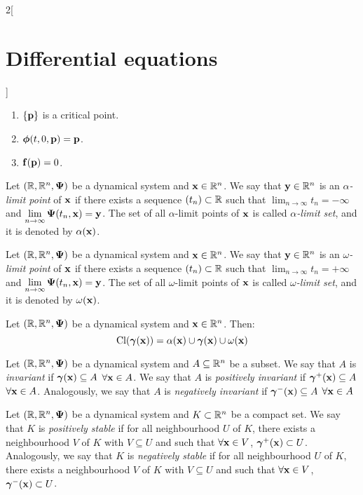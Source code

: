 \documentclass[../../../main.tex]{subfiles}
\begin{document}
\begin{multicols}{2}[\section{Differential equations}]
\begin{prop}
\begin{enumerate}
      \item $\{\boldsymbol{\mathrm{p}}\}$ is a critical point.
      \item $\boldsymbol{\mathrm{\phi}}(t,0,\boldsymbol{\mathrm{p}})=\boldsymbol{\mathrm{p}}$.
      \item $\boldsymbol{\mathrm{f}}(\boldsymbol{\mathrm{p}})=0$.
    \end{enumerate}
  \end{prop}
  \begin{definition}
    Let $(\mathbb{R},\mathbb{R}^n,\boldsymbol{\mathrm{\Psi}})$ be a dynamical system and $\boldsymbol{\mathrm{x}}\in\mathbb{R}^n$. We say that $\boldsymbol{\mathrm{y}}\in\mathbb{R}^n$ is an \emph{$\alpha$-limit point} of $\boldsymbol{\mathrm{x}}$ if there exists a sequence $(t_n)\subset\mathbb{R}$ such that $\displaystyle\lim_{n\to\infty}t_n=-\infty$ and $\displaystyle\lim_{n\to\infty}\boldsymbol{\mathrm{\Psi}}(t_n,\boldsymbol{\mathrm{x}})=\boldsymbol{\mathrm{y}}$.
    The set of all $\alpha$-limit points of $\boldsymbol{\mathrm{x}}$ is called \emph{$\alpha$-limit set}, and it is denoted by $\alpha(\boldsymbol{\mathrm{x}})$.
  \end{definition}
  \begin{definition}
    Let $(\mathbb{R},\mathbb{R}^n,\boldsymbol{\mathrm{\Psi}})$ be a dynamical system and $\boldsymbol{\mathrm{x}}\in\mathbb{R}^n$. We say that $\boldsymbol{\mathrm{y}}\in\mathbb{R}^n$ is an \emph{$\omega$-limit point} of $\boldsymbol{\mathrm{x}}$ if there exists a sequence $(t_n)\subset\mathbb{R}$ such that $\displaystyle\lim_{n\to\infty}t_n=+\infty$ and $\displaystyle\lim_{n\to\infty}\boldsymbol{\mathrm{\Psi}}(t_n,\boldsymbol{\mathrm{x}})=\boldsymbol{\mathrm{y}}$.
    The set of all $\omega$-limit points of $\boldsymbol{\mathrm{x}}$ is called \emph{$\omega$-limit set}, and it is denoted by $\omega(\boldsymbol{\mathrm{x}})$.
  \end{definition}
  \begin{prop}
    Let $(\mathbb{R},\mathbb{R}^n,\boldsymbol{\mathrm{\Psi}})$ be a dynamical system and $\boldsymbol{\mathrm{x}}\in\mathbb{R}^n$. Then: $$\operatorname{Cl}(\boldsymbol{\mathrm{\gamma}}(\boldsymbol{\mathrm{x}}))=\alpha(\boldsymbol{\mathrm{x}})\cup\boldsymbol{\mathrm{\gamma}}(\boldsymbol{\mathrm{x}})\cup\omega(\boldsymbol{\mathrm{x}})$$
  \end{prop}
  \begin{definition}
    Let $(\mathbb{R},\mathbb{R}^n,\boldsymbol{\mathrm{\Psi}})$ be a dynamical system and $A\subseteq \mathbb{R}^n$ be a subset. We say that $A$ is \emph{invariant} if $\boldsymbol{\mathrm{\gamma}}(\boldsymbol{\mathrm{x}})\subseteq A$ $\forall\boldsymbol{\mathrm{x}}\in A$. We say that $A$ is \emph{positively invariant} if $\boldsymbol{\mathrm{\gamma}}^+(\boldsymbol{\mathrm{x}})\subseteq A$ $\forall\boldsymbol{\mathrm{x}}\in A$. Analogously, we say that $A$ is \emph{negatively invariant} if $\boldsymbol{\mathrm{\gamma}}^-(\boldsymbol{\mathrm{x}})\subseteq A$ $\forall\boldsymbol{\mathrm{x}}\in A$
  \end{definition}
  \begin{definition}
    Let $(\mathbb{R},\mathbb{R}^n,\boldsymbol{\mathrm{\Psi}})$ be a dynamical system and $K\subset \mathbb{R}^n$ be a compact set. We say that $K$ is \emph{positively stable} if for all neighbourhood $U$ of $K$, there exists a neighbourhood $V$ of $K$ with $V\subseteq U$ and such that $\forall \boldsymbol{\mathrm{x}}\in V$, $\boldsymbol{\mathrm{\gamma}}^+(\boldsymbol{\mathrm{x}})\subset U$. Analogously, we say that $K$ is \emph{negatively stable} if for all neighbourhood $U$ of $K$, there exists a neighbourhood $V$ of $K$ with $V\subseteq U$ and such that $\forall \boldsymbol{\mathrm{x}}\in V$, $\boldsymbol{\mathrm{\gamma}}^-(\boldsymbol{\mathrm{x}})\subset U$.

\end{definition}
\end{multicols}
\end{document}
